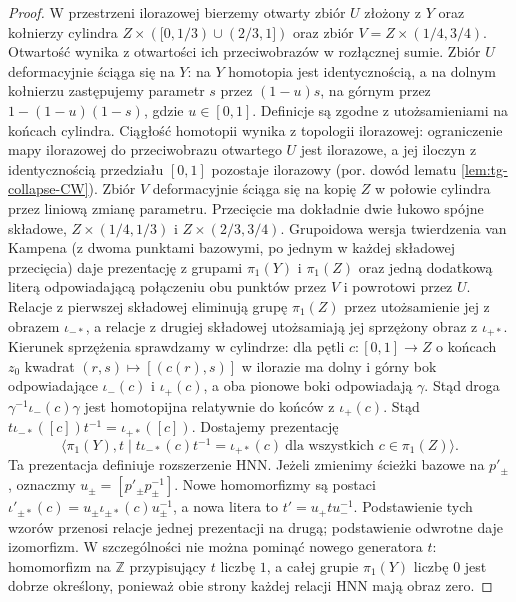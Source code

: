 \begin{proof}
W przestrzeni ilorazowej bierzemy otwarty zbiór
$U$ złożony z $Y$ oraz kołnierzy cylindra
$Z\times([0,1/3)\cup(2/3,1])$ oraz zbiór
$V=Z\times(1/4,3/4)$. Otwartość wynika
z otwartości ich przeciwobrazów w rozłącznej sumie.
Zbiór $U$ deformacyjnie ściąga się na $Y$:
na $Y$ homotopia jest identycznością, a na dolnym
kołnierzu zastępujemy parametr $s$ przez $(1-u)s$,
na górnym przez $1-(1-u)(1-s)$, gdzie $u\in[0,1]$.
Definicje są zgodne z utożsamieniami na końcach
cylindra. Ciągłość homotopii wynika z topologii
ilorazowej: ograniczenie mapy ilorazowej do
przeciwobrazu otwartego $U$ jest ilorazowe, a jej
iloczyn z identycznością przedziału $[0,1]$
pozostaje ilorazowy (por. dowód lematu
\ref{lem:tg-collapse-CW}).
Zbiór $V$ deformacyjnie ściąga się na kopię $Z$
w połowie cylindra przez liniową zmianę parametru.
Przecięcie ma dokładnie dwie łukowo spójne składowe,
$Z\times(1/4,1/3)$ i $Z\times(2/3,3/4)$.
Grupoidowa wersja twierdzenia van Kampena
(z dwoma punktami bazowymi, po jednym w każdej
składowej przecięcia) daje prezentację z grupami
$\pi_1(Y)$ i $\pi_1(Z)$ oraz jedną dodatkową
literą odpowiadającą połączeniu obu punktów
przez $V$ i powrotowi przez $U$.
Relacje z pierwszej składowej eliminują grupę
$\pi_1(Z)$ przez utożsamienie jej z obrazem
$\iota_{-*}$, a relacje z drugiej składowej
utożsamiają jej sprzężony obraz z $\iota_{+*}$.
Kierunek sprzężenia sprawdzamy w cylindrze:
dla pętli $c:[0,1]\to Z$ o końcach $z_0$
kwadrat $(r,s)\mapsto[(c(r),s)]$ w ilorazie
ma dolny i górny bok odpowiadające
$\iota_-(c)$ i $\iota_+(c)$, a oba pionowe
boki odpowiadają $\gamma$.
Stąd droga $\gamma^{-1}\iota_-(c)\gamma$
jest homotopijna relatywnie do końców
z $\iota_+(c)$.
Stąd $t\iota_{-*}([c])t^{-1}=\iota_{+*}([c])$.
Dostajemy prezentację
\[
\langle \pi_1(Y),t\mid t\iota_{-*}(c)t^{-1}=\iota_{+*}(c)
\ \text{dla wszystkich }c\in\pi_1(Z)\rangle.
\]
Ta prezentacja definiuje rozszerzenie HNN.
Jeżeli zmienimy ścieżki bazowe na $p'_\pm$,
oznaczmy $u_\pm=[p'_\pm p_\pm^{-1}]$.
Nowe homomorfizmy są postaci
$\iota'_{\pm*}(c)=u_\pm\iota_{\pm*}(c)u_\pm^{-1}$,
a nowa litera to $t'=u_+tu_-^{-1}$.
Podstawienie tych wzorów przenosi relacje
jednej prezentacji na drugą; podstawienie
odwrotne daje izomorfizm. W szczególności nie można
pominąć nowego generatora $t$: homomorfizm na
$\mathbb Z$ przypisujący $t$ liczbę $1$, a całej
grupie $\pi_1(Y)$ liczbę $0$ jest dobrze określony,
ponieważ obie strony każdej relacji HNN mają
obraz zero.
\end{proof}

